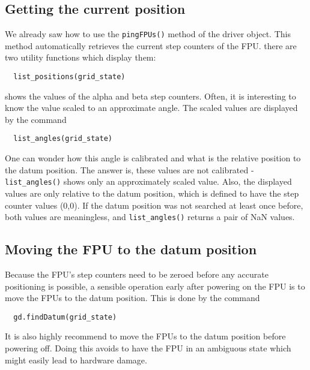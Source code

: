 \documentclass{scrartcl}[12pt,a4paper]
\begin{document}
\subsection{Getting the current position}

We already saw how to use the \texttt{pingFPUs()} method
of the driver object. This method automatically
retrieves the current step counters of the FPU.
there are two utility functions which display them:

\begin{verbatim}
  list_positions(grid_state)
\end{verbatim}

shows the values of the alpha and beta step counters.
Often, it is interesting to know the value scaled
to an approximate angle. The scaled values
are displayed by the command

\begin{verbatim}
  list_angles(grid_state)
\end{verbatim}


One can wonder how this angle is calibrated and what is the relative
position to the datum position. The answer is, these values are not
calibrated - \texttt{list\_angles()} shows only an approximately
scaled value.  Also, the displayed values are only relative to the
datum position, which is defined to have the step counter values
(0,0). If the datum position was not searched at least once before,
both values are meaningless, and \texttt{list\_angles()} returns a
pair of NaN values.




\subsection{Moving the FPU to the datum position}

Because the FPU's step counters need to be zeroed
before any accurate positioning is possible, a
sensible operation early after powering on
the FPU is to move the FPUs to the datum position.
This is done by the command

\begin{verbatim}
  gd.findDatum(grid_state)
\end{verbatim}

It is also highly recommend to move the FPUs to the datum position
before powering off. Doing this avoids to have the FPU in an ambiguous
state which might easily lead to hardware damage.
\end{document}
